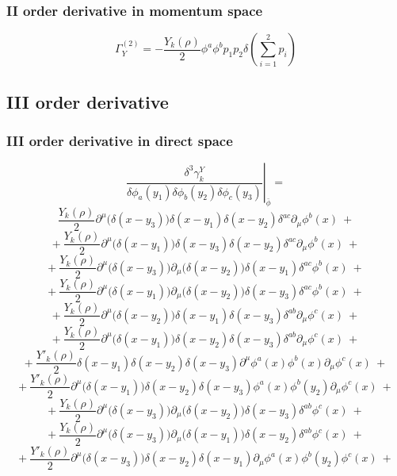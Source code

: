 \subsubsection{II order derivative in momentum space} %
\begin{equation}\label{Y2}
 \Gamma_Y^{(2)} = -\frac{Y_k(\rho)}{2}\phi^a\phi^b p_1p_2 \delta\left(\sum_{i=1}^2 p_i\right)
\end{equation}

\subsection{III order derivative}   %
\subsubsection*{III order derivative in direct space}  %
\begin{equation}
\left.\frac{\delta^3 \gamma_k^{Y}}{\delta \phi_a(y_1)\delta \phi_b(y_2)\delta \phi_c(y_3)}\right|_{\bar{\phi}}  = 
\end{equation}
$$\frac{Y_k(\rho)}{2}\partial^\mu\big(\delta(x-y_3)\big)\delta(x - y_1)\delta(x - y_2) \delta^{ac}\partial_\mu\phi^b(x) \ +$$
$$+\ \frac{Y_k(\rho)}{2}\partial^\mu\big(\delta(x-y_1)\big)\delta(x - y_3)\delta(x - y_2) \delta^{ac}\partial_\mu\phi^b(x) \ +$$
$$+\ \frac{Y_k(\rho)}{2}\partial^\mu\big(\delta(x-y_3)\big)\partial_\mu\big(\delta(x - y_2)\big)\delta(x - y_1)\delta^{ac}\phi^b(x) \ +$$
$$+\ \frac{Y_k(\rho)}{2}\partial^\mu\big(\delta(x-y_1)\big)\partial_\mu\big(\delta(x - y_2)\big)\delta(x - y_3)\delta^{ac}\phi^b(x) \ +$$
$$+\ \frac{Y_k(\rho)}{2}\partial^\mu\big(\delta(x-y_2)\big)\delta(x - y_1)\delta(x - y_3) \delta^{ab}\partial_\mu\phi^c(x) \ +$$
$$+\ \frac{Y_k(\rho)}{2}\partial^\mu\big(\delta(x-y_1)\big)\delta(x - y_2)\delta(x - y_3) \delta^{ab}\partial_\mu\phi^c(x) \ +$$
$$+\ \frac{Y'_k(\rho)}{2}\delta(x-y_1)\delta(x - y_2)\delta(x - y_3) \partial^\mu\phi^a(x)\phi^b(x)\partial_\mu\phi^c(x) \ +$$
$$+\ \frac{Y'_k(\rho)}{2}\partial^\mu\big(\delta(x-y_1)\big)\delta(x - y_2)\delta(x - y_3) \phi^a(x)\phi^b(y_2)\partial_\mu\phi^c(x) \ +$$
$$+\ \frac{Y_k(\rho)}{2}\partial^\mu\big(\delta(x-y_3)\big)\partial_\mu\big(\delta(x - y_2)\big)\delta(x - y_3)\delta^{ab}\phi^c(x) \ +$$
$$+\ \frac{Y_k(\rho)}{2}\partial^\mu\big(\delta(x-y_3)\big)\partial_\mu\big(\delta(x - y_1)\big)\delta(x - y_2)\delta^{ab}\phi^c(x) \ +$$
$$+\ \frac{Y'_k(\rho)}{2}\partial^\mu\big(\delta(x-y_3)\big)\delta(x - y_2)\delta(x - y_1)\partial_\mu \phi^a(x)\phi^b(y_2) \phi^c(x) \ +$$
